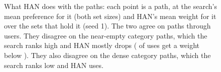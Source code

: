 \begin{figure}[htbp]
  \caption{What HAN does with the paths: each point is a path, at the search's mean preference for
    it (both set sizes) and HAN's mean weight for it over the sets that hold it (seed 1). The two
    agree on paths through users. They disagree on the near-empty category paths, which the search
    ranks high and HAN mostly drops ( of  uses get a
    weight below ). They also disagree on the dense category paths, which the search
    ranks low and HAN uses.}
  \label{fig:weights}
\end{figure}
